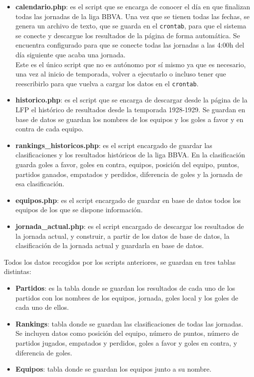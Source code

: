 \begin{itemize}
\item \textbf{calendario.php}: es el script que se encarga de conocer el día en que finalizan todas las jornadas de la liga BBVA. Una vez que se tienen todas las fechas, se genera un archivo de texto, que se guarda en el \texttt{crontab}, para que el sistema se conecte y descargue los resultados de la página de forma automática. Se encuentra configurado para que se conecte todas las jornadas a las 4:00h del día siguiente que acaba una jornada.\\
Este es el único script que no es autónomo por sí mismo ya que es necesario, una vez al inicio de temporada, volver a ejecutarlo o incluso tener que reescribirlo para que vuelva a cargar los datos en el \texttt{crontab}.

\item \textbf{historico.php}: es el script que se encarga de descargar desde la página de la LFP el histórico de resultados desde la temporada 1928-1929. Se guardan en base de datos se guardan los nombres de los equipos y los goles a favor y en contra de cada equipo.

\item \textbf{rankings\_historicos.php}: es el script encargado de guardar las clasificaciones y los resultados históricos de la liga BBVA. En la clasificación guarda goles a favor, goles en contra, equipos, posición del equipo, puntos, partidos ganados, empatados y perdidos, diferencia de goles y la jornada de esa clasificación.

\item \textbf{equipos.php}: es el script encargado de guardar en base de datos todos los equipos de los que se dispone información.

\item \textbf{jornada\_actual.php}: es el script encargado de descargar los resultados de la jornada actual, y construir, a partir de los datos de base de datos, la clasificación de la jornada actual y guardarla en base de datos.

\end{itemize}

Todos los datos recogidos por los scripts anteriores, se guardan en tres tablas distintas:

\begin{itemize}
\item \textbf{Partidos}: es la tabla donde se guardan los resultados de cada uno de los partidos con los nombres de los equipos, jornada, goles local y los goles de cada uno de ellos.

\item \textbf{Rankings}: tabla donde se guardan las clasificaciones de todas las jornadas. Se incluyen datos como posición del equipo, número de puntos, número de partidos jugados, empatados y perdidos, goles a favor y goles en contra, y diferencia de goles.

\item \textbf{Equipos}: tabla donde se guardan los equipos junto a su nombre. 
\end{itemize}

